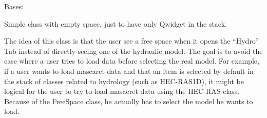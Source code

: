 \documentclass[letterpaper,10pt,english]{sphinxmanual}
\begin{document}
\begin{fulllineitems}
\label{\detokenize{index:src_GUI.hydro_GUI_2.FreeSpace}}
Bases: 

Simple class with empty space, just to have only Qwidget in the stack.


The idea of this class is that the user see a free space when it opens the “Hydro” Tab instead
of directly seeing one of the hydraulic model. The goal is to avoid the case where a user tries to load data before
selecting the real model. For example, if a user wants to load mascaret data and that an item is selected by
default in the stack of classes related to hydrology (such as HEC-RAS1D), it might be logical for the user to try
to load masacret data using the HEC-RAS class. Because of the FreeSpace class, he actually has to select
the model he wants to load.

\end{fulllineitems}

\end{document}
